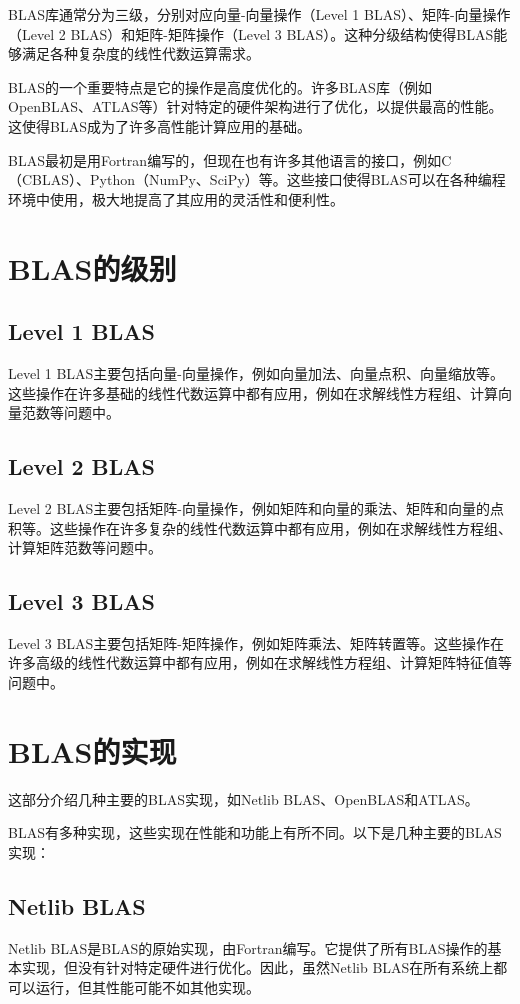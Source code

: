 \documentclass{ctexart}
\begin{document}
BLAS库通常分为三级，分别对应向量-向量操作（Level 1 BLAS）、矩阵-向量操作（Level 2 BLAS）和矩阵-矩阵操作（Level 3 BLAS）。这种分级结构使得BLAS能够满足各种复杂度的线性代数运算需求。

BLAS的一个重要特点是它的操作是高度优化的。许多BLAS库（例如OpenBLAS、ATLAS等）针对特定的硬件架构进行了优化，以提供最高的性能。这使得BLAS成为了许多高性能计算应用的基础。

BLAS最初是用Fortran编写的，但现在也有许多其他语言的接口，例如C（CBLAS）、Python（NumPy、SciPy）等。这些接口使得BLAS可以在各种编程环境中使用，极大地提高了其应用的灵活性和便利性。

\section{BLAS的级别}
\subsection{Level 1 BLAS}
Level 1 BLAS主要包括向量-向量操作，例如向量加法、向量点积、向量缩放等。这些操作在许多基础的线性代数运算中都有应用，例如在求解线性方程组、计算向量范数等问题中。

\subsection{Level 2 BLAS}
Level 2 BLAS主要包括矩阵-向量操作，例如矩阵和向量的乘法、矩阵和向量的点积等。这些操作在许多复杂的线性代数运算中都有应用，例如在求解线性方程组、计算矩阵范数等问题中。

\subsection{Level 3 BLAS}
Level 3 BLAS主要包括矩阵-矩阵操作，例如矩阵乘法、矩阵转置等。这些操作在许多高级的线性代数运算中都有应用，例如在求解线性方程组、计算矩阵特征值等问题中。

\section{BLAS的实现}
这部分介绍几种主要的BLAS实现，如Netlib BLAS、OpenBLAS和ATLAS。

BLAS有多种实现，这些实现在性能和功能上有所不同。以下是几种主要的BLAS实现：

\subsection{Netlib BLAS}
Netlib BLAS是BLAS的原始实现，由Fortran编写。它提供了所有BLAS操作的基本实现，但没有针对特定硬件进行优化。因此，虽然Netlib BLAS在所有系统上都可以运行，但其性能可能不如其他实现。
\end{document}
